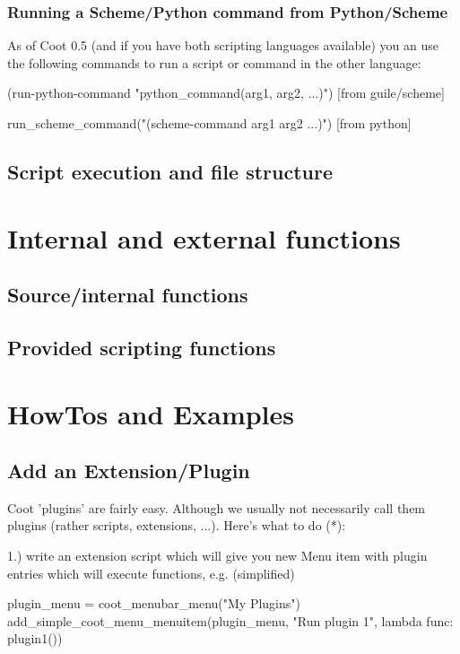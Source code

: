 \documentclass{article}
\begin{document}
\subsubsection{Running a Scheme/Python command from Python/Scheme}

As of Coot 0.5 (and if you have both scripting languages available) you an use the following commands to run a script or command in the other language:
\begin{code}
 (run-python-command "python_command(arg1, arg2, ...)")    [from guile/scheme]

 run_scheme_command("(scheme-command arg1 arg2 ...)")      [from python]
\end{code}


\subsection{Script execution and file structure}

\section{Internal and external functions}
\subsection{Source/internal functions}
\subsection{Provided scripting functions}

\section{HowTos and Examples}

\subsection{Add an Extension/Plugin}
Coot 'plugins' are fairly easy. Although we usually not necessarily call 
them plugins (rather scripts, extensions, ...). Here's what to do (*):

1.) write an extension script which will give you new Menu item with 
plugin entries which will execute functions, e.g. (simplified)

\begin{code}
plugin_menu = coot_menubar_menu("My Plugins")
add_simple_coot_menu_menuitem(plugin_menu, "Run plugin 1", lambda func: 
plugin1())
\end{code}
\end{document}

